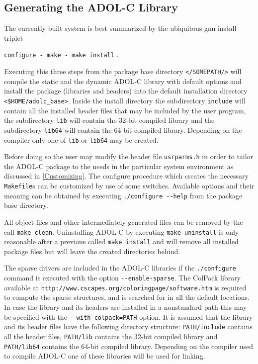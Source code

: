 \documentclass[11pt,twoside]{article}
\begin{document}
\subsection{Generating the ADOL-C Library}
\label{genlib}
%
The currently built system is best summarized by the ubiquitous gnu
install triplet 
\begin{center}
\verb=configure - make - make install= .
\end{center}
Executing this three steps from the package base directory
\verb=</SOMEPATH/=\texttt{\packagetar}\verb=>= will compile the static and the dynamic
ADOL-C library with default options and install the package (libraries
and headers) into the default installation directory {\tt
  \verb=<=\$HOME/adolc\_base\verb=>=}. Inside the install directory
the subdirectory \verb=include= will contain all the installed header
files that may be included by the user program, the subdirectory
\verb=lib= will contain the 32-bit compiled library 
and the subdirectory \verb=lib64= will contain the 64-bit compiled
library. Depending on the compiler only one of \verb=lib= or
\verb=lib64= may be created.

Before doing so the user may modify the header file \verb=usrparms.h=
in order to tailor the \mbox{ADOL-C} package to the needs in the
particular system environment as discussed in 
\autoref{Customizing}. The configure procedure which creates the necessary
\verb=Makefile=s can be customized by use of some switches. Available
options and their meaning can be obtained by executing
\verb=./configure --help= from the package base directory. 

All object files and other intermediately generated files can be
removed by the call \verb=make clean=. Uninstalling ADOL-C by
executing \verb=make uninstall= is only reasonable after a previous
called \verb=make install= and will remove all installed package files
but will leave the created directories behind. 

The sparse drivers are included in the ADOL-C libraries if the
\verb=./configure= command is executed with the option
\verb=--enable-sparse=. The ColPack library available at 
\verb=http://www.cscapes.org/coloringpage/software.htm= is required to
compute the sparse structures, and is searched for in all the default 
locations. 
In case the library and its headers are installed in a nonstandard path
this may be specified with the \verb?--with-colpack=PATH? option.
It is assumed that the library and its header files have the following
directory structure: \verb?PATH/include? contains all the header
files,
\verb?PATH/lib? contains the 32-bit compiled library and 
\verb?PATH/lib64? contains the 64-bit compiled library. Depending on
the compiler used to compile {\sf ADOL-C} one of these libraries will
be used for linking.
 
\end{document}
